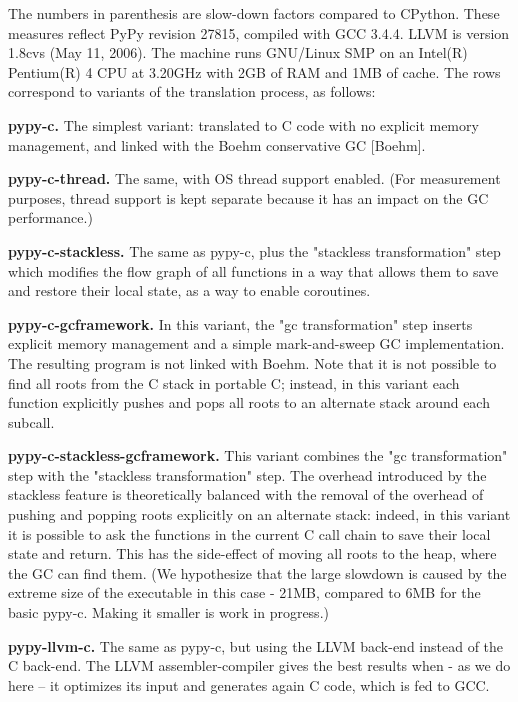\documentclass{acm_proc_article-sp}
\begin{document}
The numbers in parenthesis are slow-down factors compared to CPython.
These measures reflect PyPy revision 27815, compiled with GCC 3.4.4.
LLVM is version 1.8cvs (May 11, 2006).  The machine runs GNU/Linux SMP
on an Intel(R) Pentium(R) 4 CPU at 3.20GHz with 2GB of RAM and 1MB of
cache.  The rows correspond to variants of the translation process, as
follows:

{\bf pypy-c.}
    The simplest variant: translated to C code with no explicit memory
    management, and linked with the Boehm conservative GC [Boehm].

{\bf pypy-c-thread.}
    The same, with OS thread support enabled.  (For measurement purposes,
    thread support is kept separate because it has an impact on the GC
    performance.)

{\bf pypy-c-stackless.}
    The same as pypy-c, plus the "stackless transformation" step which
    modifies the flow graph of all functions in a way that allows them
    to save and restore their local state, as a way to enable coroutines.

{\bf pypy-c-gcframework.}
    In this variant, the "gc transformation" step inserts explicit
    memory management and a simple mark-and-sweep GC implementation.
    The resulting program is not linked with Boehm.  Note that it is not
    possible to find all roots from the C stack in portable C; instead,
    in this variant each function explicitly pushes and pops all roots
    to an alternate stack around each subcall.

{\bf pypy-c-stackless-gcframework.}
    This variant combines the "gc transformation" step with the
    "stackless transformation" step.  The overhead introduced by the
    stackless feature is theoretically balanced with the removal of the
    overhead of pushing and popping roots explicitly on an alternate
    stack: indeed, in this variant it is possible to ask the functions
    in the current C call chain to save their local state and return.
    This has the side-effect of moving all roots to the heap, where the
    GC can find them.  (We hypothesize that the large slowdown is caused
    by the extreme size of the executable in this case - 21MB, compared to
    6MB for the basic pypy-c.  Making it smaller is work in progress.)

{\bf pypy-llvm-c.}
    The same as pypy-c, but using the LLVM back-end instead of the C
    back-end.  The LLVM assembler-compiler gives the best results when -
    as we do here -- it optimizes its input and generates again C code,
    which is fed to GCC.
\end{document}
